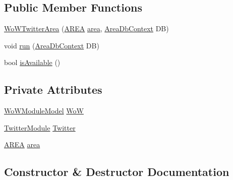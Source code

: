 \subsection*{Public Member Functions}
\begin{DoxyCompactItemize}
\item 
\mbox{\hyperlink{classArea_1_1Models_1_1WoWTwitterArea_a62573ca8e39a9111e63fb7c293852f8b}{Wo\+W\+Twitter\+Area}} (\mbox{\hyperlink{classArea_1_1Models_1_1AREA}{A\+R\+EA}} \mbox{\hyperlink{classArea_1_1Models_1_1WoWTwitterArea_a5d838ec88abae7bfecf7f5c63d9e6489}{area}}, \mbox{\hyperlink{classArea_1_1DAT_1_1AreaDbContext}{Area\+Db\+Context}} DB)
\item 
void \mbox{\hyperlink{classArea_1_1Models_1_1WoWTwitterArea_a56856ed9dc553111f0c5db1a4813f565}{run}} (\mbox{\hyperlink{classArea_1_1DAT_1_1AreaDbContext}{Area\+Db\+Context}} DB)
\item 
bool \mbox{\hyperlink{classArea_1_1Models_1_1WoWTwitterArea_af69bc0b27a27e86935da99d750d80f17}{is\+Available}} ()
\end{DoxyCompactItemize}
\subsection*{Private Attributes}
\begin{DoxyCompactItemize}
\item 
\mbox{\hyperlink{classArea_1_1Models_1_1WoWModuleModel}{Wo\+W\+Module\+Model}} \mbox{\hyperlink{classArea_1_1Models_1_1WoWTwitterArea_a7d4e48fafbb29cd9146f9bd83bba6705}{WoW}}
\item 
\mbox{\hyperlink{classArea_1_1Models_1_1TwitterModule}{Twitter\+Module}} \mbox{\hyperlink{classArea_1_1Models_1_1WoWTwitterArea_a7aec202ca6319dcaf096673c71c1a3f0}{Twitter}}
\item 
\mbox{\hyperlink{classArea_1_1Models_1_1AREA}{A\+R\+EA}} \mbox{\hyperlink{classArea_1_1Models_1_1WoWTwitterArea_a5d838ec88abae7bfecf7f5c63d9e6489}{area}}
\end{DoxyCompactItemize}


\subsection{Constructor \& Destructor Documentation}
\mbox{\label{classArea_1_1Models_1_1WoWTwitterArea_a62573ca8e39a9111e63fb7c293852f8b}} 
